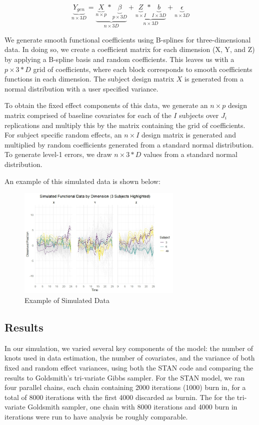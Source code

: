 \documentclass[AMA,Times1COL]{WileyNJDv5} %
\begin{document}
\begin{equation}
    \underbrace{Y_{gen}}_{n\times 3D} = \underbrace{\underbrace{X}_{n\times p}*\underbrace{\beta}_{p\times 3D}}_{n\times 3D} + \underbrace{\underbrace{Z}_{n\times I}*\underbrace{b}_{I\times 3D}}_{n\times 3D} + \underbrace{\epsilon}_{n\times 3D}
\end{equation}

We generate smooth functional coefficients using B-splines for three-dimensional data. In doing so, we create a coefficient matrix for each dimension (X, Y, and Z) by applying a B-spline basis and random coefficients.  This leaves us with a \(p\times 3*D\) grid of coefficients, where each block corresponds to smooth coefficients functions in each dimension.  The subject design matrix \(X\) is generated from a normal distribution with a user specified variance.  

To obtain the fixed effect components of this data, we generate an \(n\times p\) design matrix comprised of baseline covariates for each of the \(I\) subjects over \(J_i\) replications and multiply this by the matrix containing the grid of coefficients.  For subject specific random effects, an \(n\times I\) design matrix is generated and multiplied by random coefficients generated from a standard normal distribution.  To generate level-1 errors, we draw \(n\times 3*D\) values from a standard normal distribution. 

An example of this simulated data is shown below:

\begin{figure}[h]
    \centering
    \includegraphics[width = 0.7\textwidth]{simulated_dat.jpeg}
    \caption{Example of Simulated Data}
    \label{fig:sim_dat}
\end{figure}

\subsection{Results}
In our simulation, we varied several key components of the model: the number of knots used in data estimation, the number of covariates, and the variance of both fixed and random effect variances, using both the STAN code and comparing the results to Goldsmith's tri-variate Gibbs sampler.  For the STAN model, we ran four parallel chains, each chain containing 2000 iterations (1000) burn in, for a total of 8000 iterations with the first 4000 discarded as burnin.  The for the tri-variate Goldsmith sampler, one chain with 8000 iterations and 4000 burn in iterations were run to have analysis be roughly comparable.    
\end{document}
